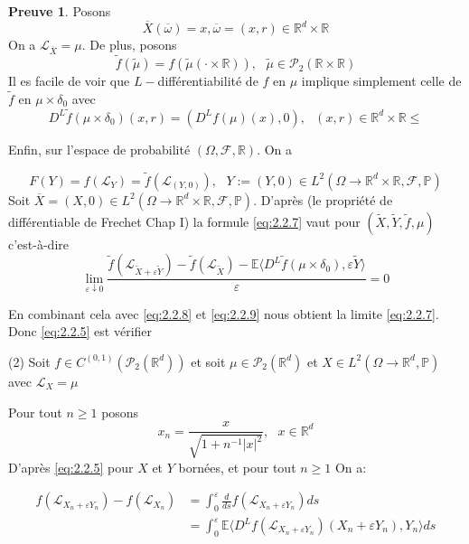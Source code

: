 \documentclass[12pt,a4paper,twoside,fleqn]{book}%
\theoremstyle{definition}
\newtheorem*{pr}{\textbf{Preuve}}
\theoremstyle{lemme}
\numberwithin{equation}{section}
\begin{document}
\begin{pr}
	Posons
	\[
	\overline{X}(\overline{\omega}) = x, \overline{\omega} = (x,r)\in\mathbb{R}^d\times\mathbb{R}
	\]
		On a $\mathcal{L}_{\overline{X}} = \mu$. De plus, posons
		\[
		\tilde{f}(\tilde{\mu}) = f(\tilde{\mu}(\cdot\times\mathbb{R})),\text{    } \tilde{\mu}\in\mathcal{P}_2(\mathbb{R}\times\mathbb{R})
		\]
	Il es facile de voir que $L-$différentiabilité de $f$ en $\mu$ implique simplement celle de $\tilde{f}$ en $\mu\times\delta_0$ avec 	
	\begin{equation}\label{eq:2.2.8}
		D^L\tilde{f}(\mu\times\delta_0)(x,r) = (D^Lf(\mu)(x),0),\text{     } (x,r)\in\mathbb{R}^d\times\mathbb{R}
\leq	\end{equation}
	
	Enfin, sur l'espace de probabilité $(\Omega,\mathcal{F},\mathbb{R})$. On a
	
	\begin{equation}\label{eq:2.2.9}
		F(Y) = f(\mathcal{L}_Y)=\tilde{f}(\mathcal{L}_{(Y,0)}),\text{    } Y:=(Y,0)\in L^2(\Omega\to \mathbb{R}^d\times\mathbb{R},\mathcal{F},\mathbb{P})
	\end{equation}
	Soit $\overline{X}= (X,0)\in L^2(\Omega\to\mathbb{R}^d\times\mathbb{R},\mathcal{F},\mathbb{P})$. D'après (le propriété de différentiable de Frechet Chap I) la formule \ref{eq:2.2.7} vaut pour $(\tilde{X},\tilde{Y},\tilde{f},\mu)$ c'est-à-dire
		\begin{equation}\label{eq:2.2.10}
		\lim_{\varepsilon\downarrow 0}\frac{\tilde{f}(\mathcal{L}_{\tilde{X}+\varepsilon\tilde{Y}}) -\tilde{f}(\mathcal{L}_{\tilde{X}})-\mathbb{E}\langle D^L\tilde{f}(\mu\times\delta_0),\varepsilon\tilde{Y}\rangle}{\varepsilon} = 0
	\end{equation}
	
	En combinant cela avec \ref{eq:2.2.8} et \ref{eq:2.2.9} nous obtient la limite \ref{eq:2.2.7}. Donc \ref{eq:2.2.5} est vérifier
	
	
	(2) Soit $f\in C^{(0,1)}(\mathcal{P}_2(\mathbb{R}^d))$ et soit $\mu\in\mathcal{P}_2(\mathbb{R}^d)$ et $X\in L^2(\Omega\to\mathbb{R}^d,\mathbb{P})$ avec $\mathcal{L}_X = \mu$
	
	Pour tout $n\geq 1$ posons
	\[
	x_n = \frac{x}{\sqrt{1+n^{-1}|x|^2}}, \text{   } x\in\mathbb{R}^d
	\]
		D'après \ref{eq:2.2.5} pour $X$ et $Y$ bornées, et pour tout $n\geq1$ On a:
		
		\begin{equation}\label{eq:2.2.11}
			\begin{aligned}
			f(\mathcal{L}_{X_n+\varepsilon Y_n}) - f(\mathcal{L}_{X_n}) &= \int_{0}^{\varepsilon}\frac{d}{ds}f(\mathcal{L}_{X_n+\varepsilon Y_n}) ds\\
			&= \int_{0}^{\varepsilon}\mathbb{E}\langle D^Lf(\mathcal{L}_{X_n+\varepsilon Y_n})(X_n+\varepsilon Y_n), Y_n\rangle ds
			\end{aligned}
		\end{equation}
		

\end{pr}
\end{document}
